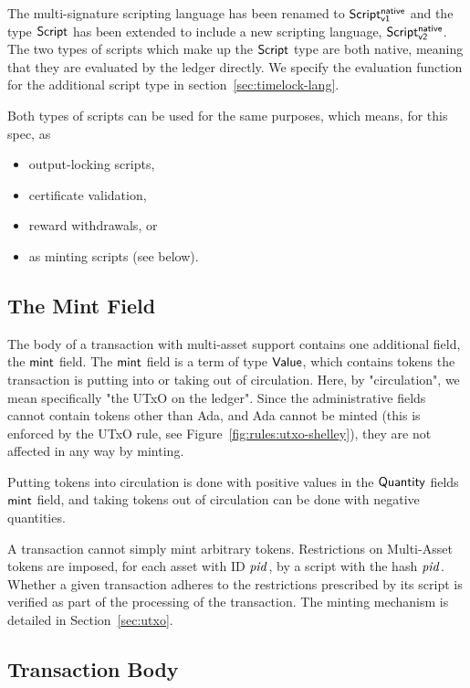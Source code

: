 The multi-signature scripting language has been renamed to $\mathsf{Script^{native}_{v1}}$ and
the type $\mathsf{Script}$ has been extended to include a new scripting language,
$\mathsf{Script^{native}_{v2}}$. The two types of scripts which make up the $\mathsf{Script}$ type are both
native, meaning
that they are evaluated by the ledger directly. We specify the evaluation
function for the additional script type in section~\ref{sec:timelock-lang}.

Both types of scripts can be used for the same purposes, which means, for this
spec, as

\begin{itemize}
  \item output-locking scripts,
  \item certificate validation,
  \item reward withdrawals, or
  \item as minting scripts (see below).
\end{itemize}

\subsection*{The Mint Field}

The body of a transaction with multi-asset support contains one additional
field, the $\mathsf{mint}$ field.
The $\mathsf{mint}$ field is a term of type $\mathsf{Value}$, which contains
tokens the transaction is putting into or taking out of
circulation. Here, by "circulation", we mean specifically "the UTxO on the
ledger". Since the administrative fields cannot contain tokens other than Ada,
and Ada cannot be minted (this is enforced by the UTxO rule, see Figure~\ref{fig:rules:utxo-shelley}),
they are not affected in any way by minting.

Putting tokens into circulation is done with positive values in the $\mathsf{Quantity}$
fields $\mathsf{mint}$ field, and taking tokens out of circulation can be done
with negative quantities.

A transaction cannot simply mint arbitrary tokens. Restrictions on
Multi-Asset tokens are imposed, for each asset with ID $\mathit{pid}$, by a script
with the hash $\mathit{pid}$. Whether a given transaction adheres to the restrictions
prescribed by its script is verified as part of the processing of the transaction.
The minting mechanism is detailed in Section~\ref{sec:utxo}.

\subsection*{Transaction Body}

